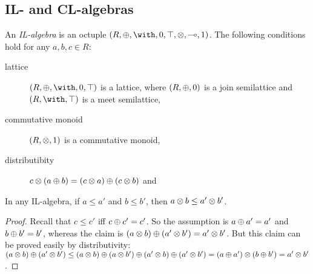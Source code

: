 
\subsection{IL- and CL-algebras}
\begin{definition}[IL-algebra]
An  {\it IL-algebra} is an octuple
$(R,\LLoplus,\with,\LLzero,\LLtop,\LLotimes,\LLimp,\LLone)$.
The following conditions hold for any $a,b,c \in R$:
\begin{description}
\item [lattice]
$(R,\oplus,\with,\LLzero,\LLtop)$ is a lattice, where
$(R,\oplus,\mbox{\boldmath{0}})$ is a join semilattice and 
$(R,\with,\LLtop)$ is a  meet semilattice,
\item [commutative monoid] 
$(R,{\otimes},\mbox{\boldmath{1}})$ is a commutative monoid, 
\item [distributibity]
$c \otimes (a \oplus b) = (c \otimes a) \oplus (c \otimes b)$ and
%
%
%
\end{description}
\end{definition}
\begin{proposition}   In any IL-algebra,
if $a \leq a'$ and $b \leq b'$, then $a \otimes b \leq a' \otimes b'$.
\end{proposition}
\begin{proof}
Recall that $c \leq c'$ iff  $c \oplus c' = c'$.
So the assumption is $a \oplus a' = a'$ and $b \oplus b' = b'$,
whereas the claim is 
$ (a \otimes b) \oplus (a' \otimes b') = a' \otimes b'$. 
But this claim can be proved easily by distributivity: 
 $ (a \otimes b) \oplus (a' \otimes b')
\leq (a \otimes b) \oplus (a \otimes b') \oplus (a' \otimes b) \oplus (a' \otimes b')
= (a \oplus a') \otimes (b \oplus b')
= a' \otimes b'$. 
\end{proof}
